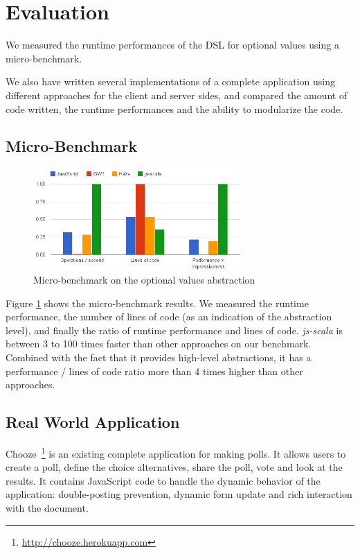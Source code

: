 \documentclass[preprint]{sigplanconf}
\begin{document}
\section{Evaluation}
\label{validation}

We measured the runtime performances of the DSL for optional values using a micro-benchmark.

We also have written several implementations of a complete application using different approaches for the client and
server sides, and compared the amount of code written, the runtime performances and the ability to modularize the
code.

\subsection{Micro-Benchmark}

\begin{figure}
\centering
\includegraphics[width=8cm]{microbenchmark.png}
\caption{Micro-benchmark on the optional values abstraction}
\label{micro-benchmark}
\end{figure}

Figure \ref{micro-benchmark} shows the micro-benchmark results. We measured the runtime performance, the number of
lines of code (as an indication of the abstraction level), and finally the ratio of runtime performance and lines of
code. \emph{js-scala} is between 3 to 100 times faster than other approaches on our benchmark. Combined with the
fact that it provides high-level abstractions, it has a performance / lines of code ratio more than 4 times higher
than other approaches.

\subsection{Real World Application}

Chooze~\footnote{\href{http://chooze.herokuapp.com}{http://chooze.herokuapp.com}} is an existing complete
application for making polls. It allows users to create a poll, define the choice alternatives, share the poll, vote
and look at the results. It contains JavaScript code to handle the dynamic behavior of the application:
double-posting prevention, dynamic form update and rich interaction with the document.
\end{document}
